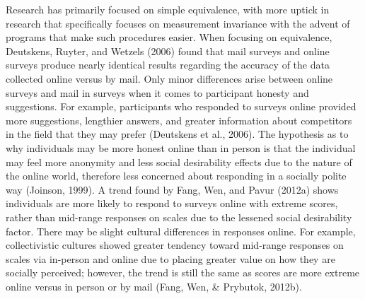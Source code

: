 \documentclass[english,man, mask]{apa6}
\theoremstyle{definition}
\theoremstyle{definition}
\theoremstyle{definition}
\theoremstyle{remark}
\begin{document}
Research has primarily focused on simple equivalence, with more uptick
in research that specifically focuses on measurement invariance with the
advent of programs that make such procedures easier. When focusing on
equivalence, Deutskens, Ruyter, and Wetzels (2006) found that mail
surveys and online surveys produce nearly identical results regarding
the accuracy of the data collected online versus by mail. Only minor
differences arise between online surveys and mail in surveys when it
comes to participant honesty and suggestions. For example, participants
who responded to surveys online provided more suggestions, lengthier
answers, and greater information about competitors in the field that
they may prefer (Deutskens et al., 2006). The hypothesis as to why
individuals may be more honest online than in person is that the
individual may feel more anonymity and less social desirability effects
due to the nature of the online world, therefore less concerned about
responding in a socially polite way (Joinson, 1999). A trend found by
Fang, Wen, and Pavur (2012a) shows individuals are more likely to
respond to surveys online with extreme scores, rather than mid-range
responses on scales due to the lessened social desirability factor.
There may be slight cultural differences in responses online. For
example, collectivistic cultures showed greater tendency toward
mid-range responses on scales via in-person and online due to placing
greater value on how they are socially perceived; however, the trend is
still the same as scores are more extreme online versus in person or by
mail (Fang, Wen, \& Prybutok, 2012b).
\end{document}
